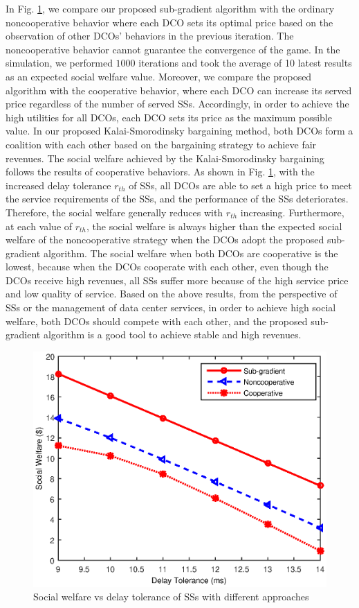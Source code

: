 \documentclass[twocolumn,10pt]{IEEEtran}
\begin{document}
In Fig. \ref{fig:rth_vs_social}, we compare our proposed sub-gradient algorithm with the ordinary noncooperative behavior where each DCO sets its optimal price based on the observation of other DCOs' behaviors in the previous iteration. The noncooperative behavior cannot guarantee the convergence of the game. In the simulation, we performed $1000$ iterations and took the average of 10 latest results as an expected social welfare value. Moreover, we compare the proposed algorithm with the cooperative behavior, where each DCO can increase its served price regardless of the number of served SSs. Accordingly, in order to achieve the high utilities for all DCOs, each DCO sets its price as the maximum possible value. In our proposed Kalai-Smorodinsky bargaining method, both DCOs form a coalition with each other based on the bargaining strategy to achieve fair revenues. The social welfare achieved by the Kalai-Smorodinsky bargaining follows the results of cooperative behaviors. As shown in Fig. \ref{fig:rth_vs_social}, with the increased delay tolerance $r_{th}$ of SSs, all DCOs are able to set a high price to meet the service requirements of the SSs, and the performance of the SSs deteriorates. Therefore, the social welfare generally reduces with $r_{th}$ increasing. Furthermore, at each value of $r_{th}$, the social welfare is always higher than the expected social welfare of the noncooperative strategy when the DCOs adopt the proposed sub-gradient algorithm. The social welfare when both DCOs are cooperative is the lowest, because when the DCOs cooperate with each other, even though the DCOs receive high revenues, all SSs suffer more because of the high service price and low quality of service. Based on the above results, from the perspective of SSs or the management of data center services, in order to achieve high social welfare, both DCOs should compete with each other, and the proposed sub-gradient algorithm is a good tool to achieve stable and high revenues.

\begin{figure}[!t]
\centering
\includegraphics[scale=0.45, bb=391 0 18 299]{fig_rth_social.eps}
\caption{Social welfare vs delay tolerance of SSs with different approaches}
\label{fig:rth_vs_social}
\end{figure}
\end{document}
